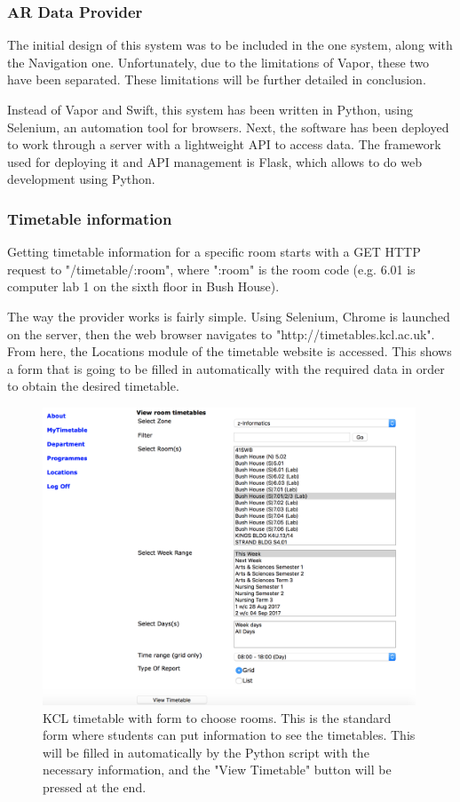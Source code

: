 \subsubsection{AR Data Provider}

The initial design of this system was to be included in the one system, along with the Navigation one. Unfortunately, due to the limitations of Vapor, these two have been separated. These limitations will be further detailed in conclusion.

Instead of Vapor and Swift, this system has been written in Python, using Selenium, an automation tool for browsers. Next, the software has been deployed to work through a server with a lightweight API to access data. The framework used for deploying it and API management is Flask, which allows to do web development using Python.

\subsubsection*{Timetable information}
Getting timetable information for a specific room starts with a GET HTTP request to "/timetable/:room", where ":room" is the room code (e.g. 6.01 is computer lab 1 on the sixth floor in Bush House). 

The way the provider works is fairly simple. Using Selenium, Chrome is launched on the server, then the web browser navigates to "http://timetables.kcl.ac.uk". From here, the Locations module of the timetable website is accessed. This shows a form that is going to be filled in automatically with the required data in order to obtain the desired timetable.

\begin{figure}[H]
    \centering
    \includegraphics[width=420px, height=335px]{Implementation&Testing/timetable.png}
    \centering
    \caption{KCL timetable with form to choose rooms. This is the standard form where students can put information to see the timetables. This will be filled in automatically by the Python script with the necessary information, and the "View Timetable" button will be pressed at the end.}
\end{figure}

